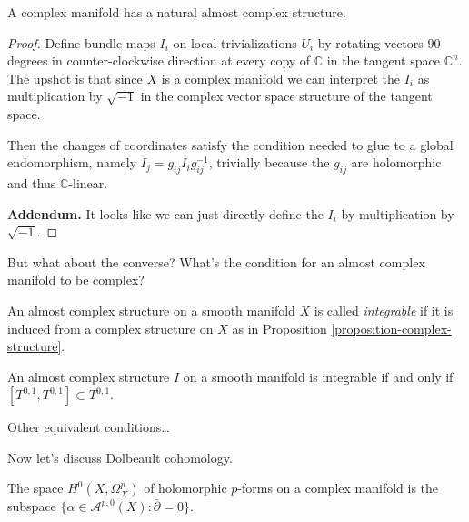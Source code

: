 \begin{proposition}
\label{proposition-complex-structure}
A complex manifold has a natural almost complex structure.
\end{proposition}

\begin{proof}
Define bundle maps $I_i$ on local trivializations $U_i$
by rotating vectors $90$ degrees in counter-clockwise
direction at every copy of $\mathbb{C}$ in the tangent space $\mathbb{C}^n$.
The upshot is that since $X$ is a complex manifold
we can interpret the $I_i$ as multiplication by $\sqrt{-1}$ 
in the complex vector space structure of the tangent space.

Then the changes of coordinates satisfy the condition
needed to glue to a global endomorphism, namely
$I_j=g_{ij}I_ig_{ij}^{-1}$, trivially because
the $g_{ij}$ are holomorphic and thus $\mathbb{C}$-linear.

\noindent
{\bf Addendum.} It looks like we can just directly
define the $I_i$ by multiplication by $\sqrt{-1}$.
\end{proof}


\noindent
But what about the converse?
What's the condition for an almost complex manifold to be complex?

\begin{definition}
\label{definition-integrable-almost-complex-structure}
An almost complex structure on a smooth manifold $X$ 
is called {\it integrable} if it is induced from a
complex structure on $X$ as in Proposition \ref{proposition-complex-structure}.
\end{definition}

\begin{theorem}
\label{theorem-newlander-nirenberg}
An almost complex structure $I$ 
on a smooth manifold is integrable if and only if
$[T^{0,1},T^{0,1}]\subset T^{0,1}$.
\end{theorem}

Other equivalent conditions…





\medskip\noindent
Now let's discuss Dolbeault cohomology.


\begin{proposition}
\label{proposition-dolbeault-proposition}
\begin{reference}
\cite[Proposition 2.6.11]{huc}
\end{reference}
The space $H^0(X,\Omega^p_X)$ of holomorphic
$p$-forms on a complex manifold is the subspace
$\{\alpha \in \mathcal{A}^{p,0}(X):\bar\partial=0\}$.
\end{proposition}

